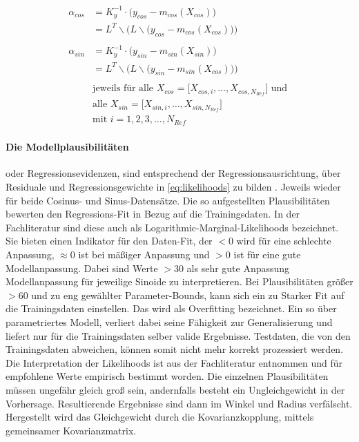 \begin{align}\label{eq:gprweights}
	\alpha_{cos} &= K_y^{-1} \cdot \big( y_{cos} - m_{cos}(X_{cos}) \big) \nonumber \\
				 &= L^T \backslash \Big(L \backslash \big( y_{cos} - m_{cos}(X_{cos}) \big) \Big) \nonumber \\
	\\
	\alpha_{sin} &= K_y^{-1} \cdot \big( y_{sin} - m_{sin}(X_{sin}) \big) \nonumber \\
				 &= L^T \backslash \Big(L \backslash \big( y_{sin} - m_{sin}(X_{cos}) \big) \Big) \nonumber \\
	\nonumber \\
& \text{jeweils für alle } X_{cos} = \big[ X_{cos,i},\dots, X_{cos,N_{Ref}} \big] \text{ und } \nonumber \\
& \text{alle } X_{sin} = \big[ X_{sin,i},\dots, X_{sin,N_{Ref}} \big] \nonumber \\
& \text{mit } i = 1,2,3,\ldots,N_{Ref} \nonumber
\end{align}


\clearpage


\paragraph*{Die Modellplausibilitäten} oder Regressionsevidenzen, sind entsprechend der Regressionsausrichtung, über Residuale und Regressionsgewichte in \autoref{eq:likelihoods} zu bilden \cite{Rasmussen2006}. Jeweils wieder für beide Cosinus- und Sinus-Datensätze. Die so aufgestellten Plausibilitäten bewerten den Regressions-Fit in Bezug auf die Trainingsdaten. In der Fachliteratur \cite{Rasmussen2006} sind diese auch als Logarithmic-Marginal-Likelihoods bezeichnet. Sie bieten einen Indikator für den Daten-Fit, der $< 0$ wird für eine schlechte Anpassung, $\approx 0$ ist bei mäßiger Anpassung und $> 0$ ist für eine gute Modellanpassung. Dabei sind Werte $> 30$ als sehr gute Anpassung Modellanpassung für jeweilige Sinoide zu interpretieren. Bei Plausibilitäten größer $> 60$ und zu eng gewählter Parameter-Bounds, kann sich ein zu Starker Fit auf die Trainingsdaten einstellen. Das wird als Overfitting bezeichnet. Ein so über parametriertes Modell, verliert dabei seine Fähigkeit zur Generalisierung und liefert nur für die Trainingsdaten selber valide Ergebnisse. Testdaten, die von den Trainingsdaten abweichen, können somit nicht mehr korrekt prozessiert werden. Die Interpretation der Likelihoods ist aus der Fachliteratur \cite{Rasmussen2006} entnommen und für empfohlene Werte empirisch bestimmt worden. Die einzelnen Plausibilitäten müssen ungefähr gleich groß sein, andernfalls besteht ein Ungleichgewicht in der Vorhersage. Resultierende Ergebnisse sind dann im Winkel und Radius verfälscht. Hergestellt wird das Gleichgewicht durch die Kovarianzkopplung, mittels gemeinsamer Kovarianzmatrix.


